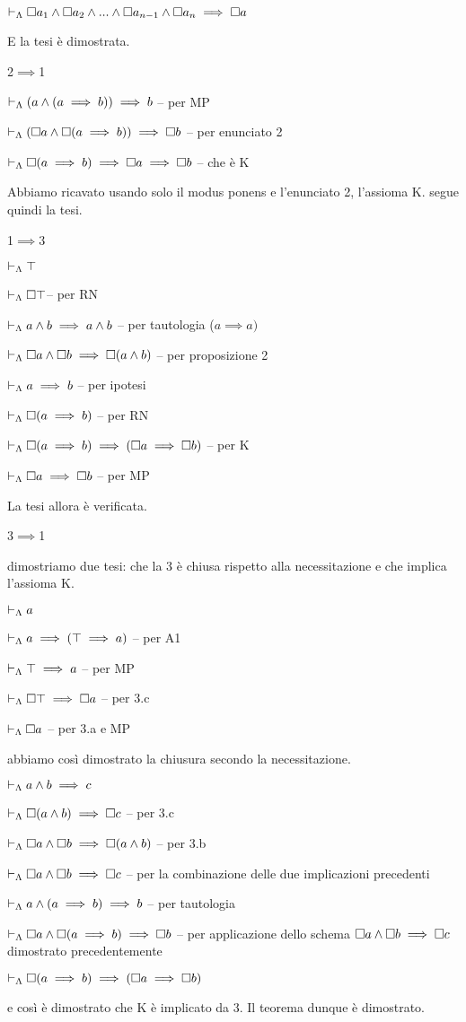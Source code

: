 $\vdash_{\Lambda}\square a_{1}\wedge\square a_{2}\wedge...\wedge\square a_{n-1}\wedge\square a_{n}\implies\square a$ 

E la tesi è dimostrata.

2$\implies$1

$\vdash_{\Lambda}(a\wedge(a\implies b))\implies b$ -- per MP

$\vdash_{\Lambda}(\square a\wedge\square(a\implies b))\implies\square b$
-- per enunciato 2

$\vdash_{\Lambda}\square(a\implies b)\implies\square a\implies\square b$
-- che è K

Abbiamo ricavato usando solo il modus ponens e l'enunciato 2, l'assioma
K. segue quindi la tesi.

1$\implies3$

$\vdash_{\Lambda}\top$

$\vdash_{\Lambda}\square\top$-- per RN

$\vdash_{\Lambda}a\wedge b\implies a\wedge b$ -- per tautologia
($a\implies a)$

$\vdash_{\Lambda}\square a\wedge\square b\implies\square(a\wedge b)$ --
per proposizione 2

$\vdash_{\Lambda}a\implies b$ -- per ipotesi

$\vdash_{\Lambda}\square(a\implies b)$ -- per RN

$\vdash_{\Lambda}\square(a\implies b)\implies(\square a\implies\square b)$
-- per K

$\vdash_{\Lambda}\square a\implies\square b$ -- per MP

La tesi allora è verificata.

3$\implies$1

dimostriamo due tesi: che la 3 è chiusa rispetto alla necessitazione
e che implica l'assioma K.

$\vdash_{\Lambda}a$

$\vdash_{\Lambda}a\implies(\top\implies a)$ -- per A1

$\vdash_{\Lambda}\top\implies a$ -- per MP

$\vdash_{\Lambda}\square\top\implies\square a$ -- per 3.c

$\vdash_{\Lambda}\square a$ -- per 3.a e MP

abbiamo così dimostrato la chiusura secondo la necessitazione.

$\vdash_{\Lambda}a\wedge b\implies c$

$\vdash_{\Lambda}\square(a\wedge b)\implies\square c$ -- per 3.c

$\vdash_{\Lambda}\square a\wedge\square b\implies\square(a\wedge b)$ --
per 3.b

$\vdash_{\Lambda}\square a\wedge\square b\implies\square c$ -- per la combinazione
delle due implicazioni precedenti

$\vdash_{\Lambda}a\wedge(a\implies b)\implies b$ -- per tautologia

$\vdash_{\Lambda}\square a\wedge\square(a\implies b)\implies\square b$
-- per applicazione dello schema $\square a\wedge\square b\implies\square c$
dimostrato precedentemente

$\vdash_{\Lambda}\square(a\implies b)\implies(\square a\implies\square b)$

e così è dimostrato che K è implicato da 3. Il teorema dunque è dimostrato.
